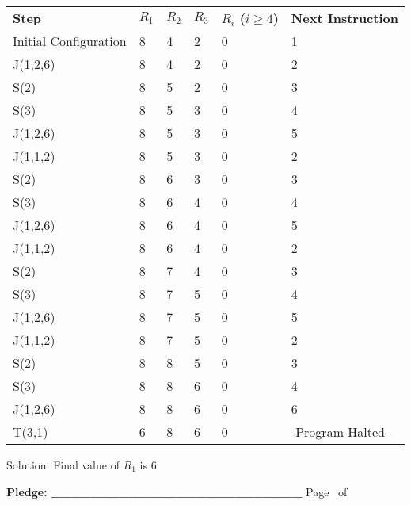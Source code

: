 \documentclass[12pt]{article}
\begin{document}
\begin{table}[h]
    \begin{tabular}{llllll}
    \textbf{Step}                  & \textbf{$R_1$} & \textbf{$R_2$} & \textbf{$R_3$} & \textbf{$R_i$ ($i\geq4$)} & \textbf{Next Instruction} \\
    Initial Configuration & 8   & 4   & 2   & 0          & 1                \\
    J(1,2,6)              & 8   & 4   & 2   & 0          & 2                \\
    S(2)                  & 8   & 5   & 2   & 0          & 3                \\
    S(3)                  & 8   & 5   & 3   & 0          & 4                \\
    J(1,2,6)              & 8   & 5   & 3   & 0          & 5                \\
    J(1,1,2)              & 8   & 5   & 3   & 0          & 2                \\
    S(2)                  & 8   & 6   & 3   & 0          & 3                \\
    S(3)                  & 8   & 6   & 4   & 0          & 4                \\
    J(1,2,6)              & 8   & 6   & 4   & 0          & 5                \\
    J(1,1,2)              & 8   & 6   & 4   & 0          & 2                \\
    S(2)                  & 8   & 7   & 4   & 0          & 3                \\
    S(3)                  & 8   & 7   & 5   & 0          & 4                \\
    J(1,2,6)              & 8   & 7   & 5   & 0          & 5                \\
    J(1,1,2)              & 8   & 7   & 5   & 0          & 2                \\
    S(2)                  & 8   & 8   & 5   & 0          & 3                \\
    S(3)                  & 8   & 8   & 6   & 0          & 4                \\
    J(1,2,6)              & 8   & 8   & 6   & 0          & 6                \\
    T(3,1)                & 6   & 8   & 6   & 0          & -Program Halted-               \\
    \end{tabular}
\end{table}

Solution: Final value of $R_1$ is $6$

\vfill
\textbf{Pledge: \_\_\_\_\_\_\_\_\_\_\_\_\_\_\_\_\_\_\_\_\_\_\_\_\_\_} \hfill Page \thepage\ of \pageref{LastPage}
\end{document}
